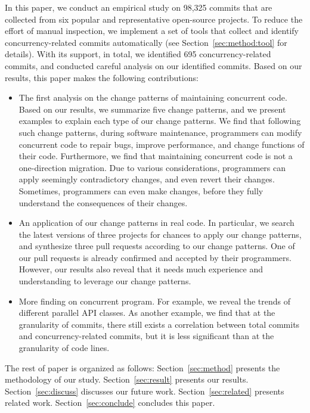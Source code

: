 In this paper, we conduct an empirical study on 98,325 commits that are collected from six popular and representative open-source projects. To reduce the effort of manual inspection, we implement a set of tools that collect and identify concurrency-related commits automatically (see Section~\ref{sec:method:tool} for details). With its support, in total, we identified 695 concurrency-related commits, and conducted careful analysis on our identified commits. Based on our results, this paper makes the following contributions:

\begin{itemize}
	\item The first analysis on the change patterns of maintaining concurrent code. Based on our results, we summarize five change patterns, and we present examples to explain each type of our change patterns. We find that following such change patterns, during software maintenance, programmers can modify concurrent code to repair bugs, improve performance, and change functions of their code. Furthermore, we find that maintaining concurrent code is not a one-direction migration. Due to various considerations, programmers can apply seemingly contradictory changes, and even revert their changes. Sometimes, programmers can even make changes, before they fully understand the consequences of their changes.
	\item An application of our change patterns in real code. In particular, we search the latest versions of three projects for chances to apply our change patterns, and synthesize three pull requests according to our change patterns. One of our pull requests is already confirmed and accepted by their programmers. However, our results also reveal that it needs much experience and understanding to leverage our change patterns.
	\item More finding on concurrent program. For example, we reveal the trends of different parallel API classes. As another example, we find that at the granularity of commits, there still exists a correlation between total commits and concurrency-related commits, but it is less significant than at the granularity of code lines.
\end{itemize}

The rest of paper is organized as follows: Section~\ref{sec:method} presents the methodology of our study. Section~\ref{sec:result} presents our results. Section~\ref{sec:discuss} discusses our future work. Section~\ref{sec:related} presents related work. Section~\ref{sec:conclude} concludes this paper.
